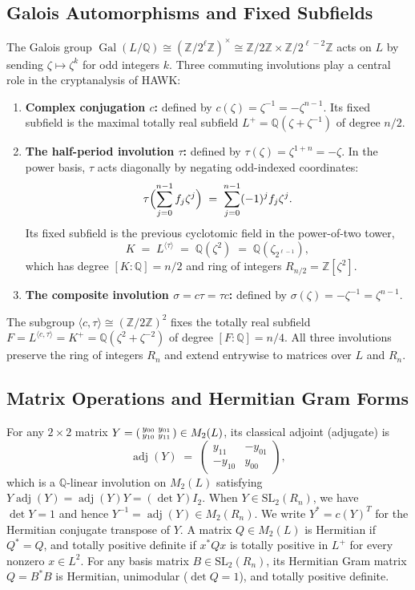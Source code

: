 \documentclass[11pt,a4paper]{article}
\theoremstyle{definition}
\newcommand{\Z}{\mathbb{Z}}
\newcommand{\Q}{\mathbb{Q}}
\newcommand{\adj}{\operatorname{adj}}
\begin{document}
\subsection{Galois Automorphisms and Fixed Subfields}
The Galois group $\operatorname{Gal}(L/\Q) \cong (\Z/2^\ell\Z)^\times \cong \Z/2\Z \times \Z/2^{\ell-2}\Z$ acts on $L$ by sending $\zeta \mapsto \zeta^k$ for odd integers $k$. Three commuting involutions play a central role in the cryptanalysis of HAWK:
\begin{enumerate}[leftmargin=*]
\item \textbf{Complex conjugation $c$:} defined by $c(\zeta) = \zeta^{-1} = -\zeta^{n-1}$. Its fixed subfield is the maximal totally real subfield $L^+ = \Q(\zeta + \zeta^{-1})$ of degree $n/2$.
\item \textbf{The half-period involution $\tau$:} defined by $\tau(\zeta) = \zeta^{1+n} = -\zeta$. In the power basis, $\tau$ acts diagonally by negating odd-indexed coordinates:
\[
  \tau\Bigl(\sum_{j=0}^{n-1} f_j \zeta^j\Bigr) \;=\; \sum_{j=0}^{n-1} (-1)^j f_j \zeta^j.
\]
Its fixed subfield is the previous cyclotomic field in the power-of-two tower,
\[
  K \;=\; L^{\langle\tau\rangle} \;=\; \Q(\zeta^2) \;=\; \Q(\zeta_{2^{\ell-1}}),
\]
which has degree $[K:\Q] = n/2$ and ring of integers $R_{n/2} = \Z[\zeta^2]$.
\item \textbf{The composite involution $\sigma = c\tau = \tau c$:} defined by $\sigma(\zeta) = -\zeta^{-1} = \zeta^{n-1}$.
\end{enumerate}
The subgroup $\langle c, \tau \rangle \cong (\Z/2\Z)^2$ fixes the totally real subfield $F = L^{\langle c,\tau\rangle} = K^+ = \Q(\zeta^2 + \zeta^{-2})$ of degree $[F:\Q] = n/4$. All three involutions preserve the ring of integers $R_n$ and extend entrywise to matrices over $L$ and $R_n$.

\subsection{Matrix Operations and Hermitian Gram Forms}
For any $2 \times 2$ matrix $Y = \begin{psmallmatrix} y_{00} & y_{01} \\ y_{10} & y_{11} \end{psmallmatrix} \in M_2(L)$, its classical adjoint (adjugate) is
\[
  \adj(Y) \;=\; \begin{pmatrix} y_{11} & -y_{01} \\ -y_{10} & y_{00} \end{pmatrix},
\]
which is a $\Q$-linear involution on $M_2(L)$ satisfying $Y \adj(Y) = \adj(Y) Y = (\det Y) I_2$. When $Y \in \mathrm{SL}_2(R_n)$, we have $\det Y = 1$ and hence $Y^{-1} = \adj(Y) \in M_2(R_n)$. We write $Y^* = c(Y)^T$ for the Hermitian conjugate transpose of $Y$. A matrix $Q \in M_2(L)$ is Hermitian if $Q^* = Q$, and totally positive definite if $x^* Q x$ is totally positive in $L^+$ for every nonzero $x \in L^2$. For any basis matrix $B \in \mathrm{SL}_2(R_n)$, its Hermitian Gram matrix $Q = B^* B$ is Hermitian, unimodular ($\det Q = 1$), and totally positive definite.
\end{document}
